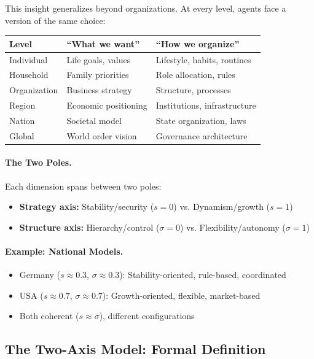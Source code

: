 \documentclass[12pt,a4paper]{article}
\begin{document}
This insight generalizes beyond organizations.
At every level, agents face a version of the same choice:
\begin{center}
\renewcommand{\arraystretch}{1.3}
\begin{tabular}{lll}
\hline
\textbf{Level} & \textbf{``What we want''} & \textbf{``How we organize''} \\
\hline
Individual & Life goals, values & Lifestyle, habits, routines \\
Household & Family priorities & Role allocation, rules \\
Organization & Business strategy & Structure, processes \\
Region & Economic positioning & Institutions, infrastructure \\
Nation & Societal model & State organization, laws \\
Global & World order vision & Governance architecture \\
\hline
\end{tabular}
\end{center}

\paragraph{The Two Poles.}
Each dimension spans between two poles:
\begin{itemize}
  \item \textbf{Strategy axis:} Stability/security ($s = 0$) vs. Dynamism/growth ($s = 1$)
  \item \textbf{Structure axis:} Hierarchy/control ($\sigma = 0$) vs. Flexibility/autonomy ($\sigma = 1$)
\end{itemize}

\paragraph{Example: National Models.}
\begin{itemize}
  \item Germany ($s \approx 0.3$, $\sigma \approx 0.3$): Stability-oriented, rule-based, coordinated
  \item USA ($s \approx 0.7$, $\sigma \approx 0.7$): Growth-oriented, flexible, market-based
  \item Both coherent ($s \approx \sigma$), different configurations
\end{itemize}

\subsection{The Two-Axis Model: Formal Definition}
\end{document}
